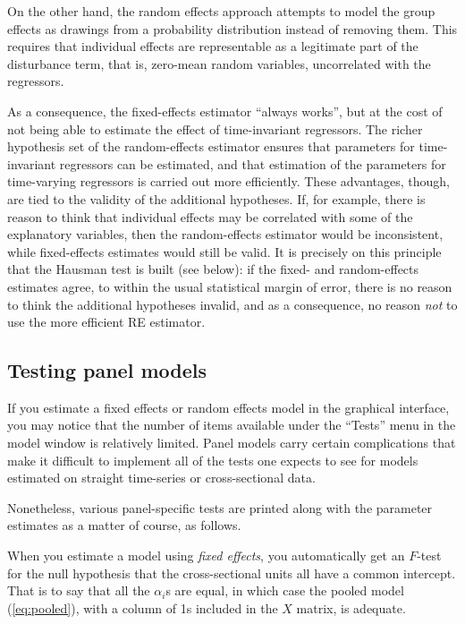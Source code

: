 On the other hand, the random effects approach attempts to model the
group effects as drawings from a probability distribution instead of
removing them. This requires that individual effects are representable
as a legitimate part of the disturbance term, that is, zero-mean
random variables, uncorrelated with the regressors.

As a consequence, the fixed-effects estimator ``always works'', but at
the cost of not being able to estimate the effect of time-invariant
regressors.  The richer hypothesis set of the random-effects estimator
ensures that parameters for time-invariant regressors can be
estimated, and that estimation of the parameters for time-varying
regressors is carried out more efficiently.  These advantages, though,
are tied to the validity of the additional hypotheses. If, for
example, there is reason to think that individual effects may be
correlated with some of the explanatory variables, then the
random-effects estimator would be inconsistent, while fixed-effects
estimates would still be valid.  It is precisely on this principle
that the Hausman test is built (see below): if the fixed- and
random-effects estimates agree, to within the usual statistical margin
of error, there is no reason to think the additional hypotheses
invalid, and as a consequence, no reason \textit{not} to use the more
efficient RE estimator.

\subsection{Testing panel models}
\label{panel-tests}

If you estimate a fixed effects or random effects model in the
graphical interface, you may notice that the number of items available
under the ``Tests'' menu in the model window is relatively limited.
Panel models carry certain complications that make it difficult to
implement all of the tests one expects to see for models estimated on
straight time-series or cross-sectional data.  

Nonetheless, various panel-specific tests are printed along with the
parameter estimates as a matter of course, as follows.

When you estimate a model using \textsl{fixed effects}, you
automatically get an $F$-test for the null hypothesis that the
cross-sectional units all have a common intercept.  That is to say
that all the $\alpha_i$s are equal, in which case the pooled model
(\ref{eq:pooled}), with a column of 1s included in the $X$ matrix, is
adequate.

